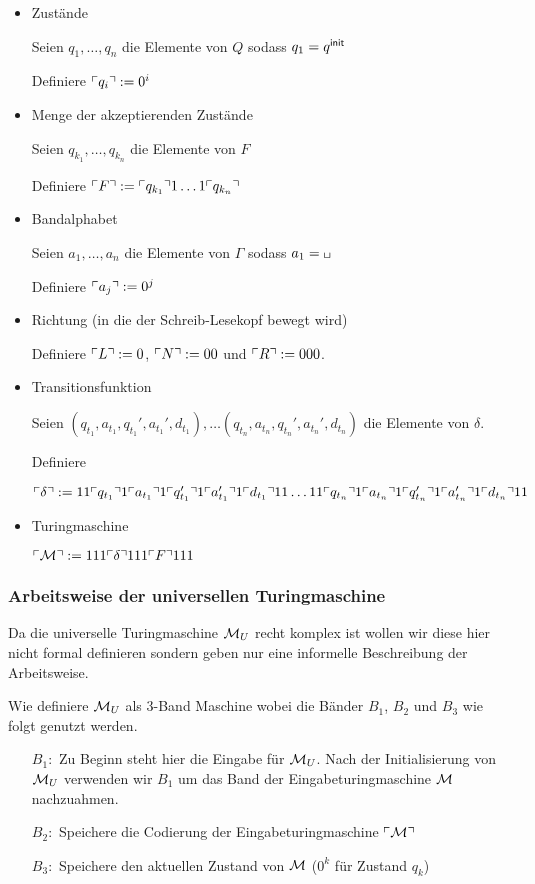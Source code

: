 \begin{itemize}
 \item Zustände
 
    Seien $q_1,\dots, q_{n}$ die Elemente von $Q$ sodass $q_1=q^\mathsf{init}$ 
    
    Definiere $\ulcorner q_i \urcorner:=0^i$
    
  \item Menge der akzeptierenden Zustände
  
    Seien $q_{k_1},\dots, q_{k_n}$ die Elemente von $F$
    
    Definiere $\ulcorner F \urcorner:=\ulcorner q_{k_1} \urcorner 1 \ldots 1 \ulcorner q_{k_n} \urcorner$
    
  \item Bandalphabet
  
    Seien $a_1,\dots, a_{n}$ die Elemente von $\Gamma$ sodass $a_1=\blank$
    
    Definiere $\ulcorner a_j \urcorner:=0^j$
    
  \item Richtung (in die der Schreib-Lesekopf bewegt wird)
  
    Definiere $\ulcorner L \urcorner:=0$, $\ulcorner N \urcorner:=00$ und $\ulcorner R \urcorner:=000$.
    
  \item Transitionsfunktion
  
   Seien $(q_{t_1}, a_{t_1}, q_{t_1}', a_{t_1}', d_{t_1}),\dots (q_{t_n}, a_{t_n}, q_{t_n}', a_{t_n}', d_{t_n})$ die Elemente von $\delta$.
  
   Definiere 
   
   $\ulcorner \delta \urcorner:= 11\ulcorner q_{t_1} \urcorner1\ulcorner a_{t_1} \urcorner1\ulcorner q_{t_1}' \urcorner1\ulcorner a_{t_1}' \urcorner1\ulcorner d_{t_1} \urcorner11\dots 11 \ulcorner q_{t_n} \urcorner1\ulcorner a_{t_n} \urcorner1\ulcorner q_{t_n}' \urcorner1 \ulcorner a_{t_n}' \urcorner1\ulcorner d_{t_n} \urcorner11$
   
   \item Turingmaschine
   
   $\ulcorner \mathcal{M} \urcorner:=111\ulcorner \delta \urcorner111\ulcorner F \urcorner111$
\end{itemize}


\subsubsection{Arbeitsweise der universellen Turingmaschine}
Da die universelle Turingmaschine $\mathcal{M}_U$ recht komplex ist wollen wir diese hier nicht formal definieren sondern geben nur eine informelle Beschreibung der Arbeitsweise.


Wie definiere $\mathcal{M}_U$ als 3-Band Maschine wobei die Bänder $B_1$, $B_2$ und $B_3$ wie folgt genutzt werden.
\begin{itemize}
\item[$B_1:$] Zu Beginn steht hier die Eingabe für $\mathcal{M}_U$.
Nach der Initialisierung von $\mathcal{M}_U$ verwenden wir $B_1$ um das Band der Eingabeturingmaschine $\mathcal{M}$ nachzuahmen.
\item[$B_2:$] Speichere die Codierung der Eingabeturingmaschine $\ulcorner \mathcal{M} \urcorner$
\item[$B_3:$] Speichere den aktuellen Zustand von $\mathcal{M}$ ($0^k$ für Zustand $q_k$)
\end{itemize}

